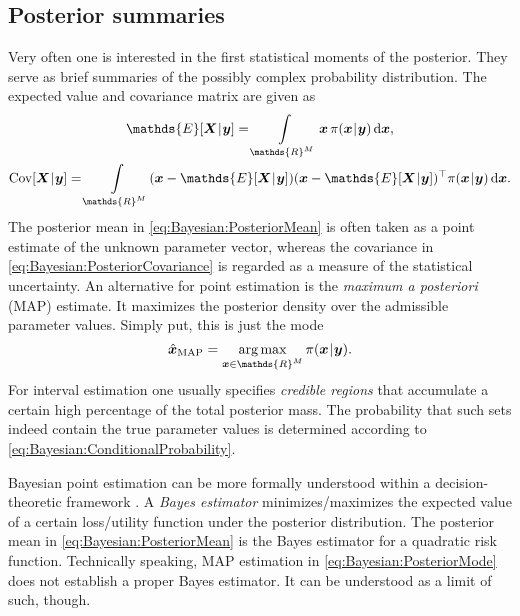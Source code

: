 \subsection{Posterior summaries}
Very often one is interested in the first statistical moments of the posterior.
They serve as brief summaries of the possibly complex probability distribution.
The expected value and covariance matrix are given as
\begin{gather}
  \mathds{E}[\bm{X} \cond \bm{y}] = \int\limits_{\mathds{R}^\dimParam} \bm{x} \, \pi(\bm{x} \cond \bm{y}) \, \mathrm{d} \bm{x}, \label{eq:Bayesian:PosteriorMean} \\
  \mathrm{Cov}[\bm{X} \cond \bm{y}]
  = \int\limits_{\mathds{R}^\dimParam} (\bm{x} - \mathds{E}[\bm{X} \cond \bm{y}]) (\bm{x} - \mathds{E}[\bm{X} \cond \bm{y}])^\top 
  \pi(\bm{x} \cond \bm{y}) \, \mathrm{d} \bm{x}. \label{eq:Bayesian:PosteriorCovariance}
\end{gather}
The posterior mean in \cref{eq:Bayesian:PosteriorMean} is often taken as a point estimate of the unknown parameter vector,
whereas the covariance in \cref{eq:Bayesian:PosteriorCovariance} is regarded as a measure of the statistical uncertainty.
An alternative for point estimation is the \emph{maximum a posteriori} (MAP) estimate.
It maximizes the posterior density over the admissible parameter values.
Simply put, this is just the mode
\begin{equation} \label{eq:Bayesian:PosteriorMode}
  \hat{\bm{x}}_{\mathrm{MAP}} = \operatorname*{arg\,max}_{\bm{x} \in \mathds{R}^\dimParam} \pi(\bm{x} \cond \bm{y}).
\end{equation}
For interval estimation one usually specifies \emph{credible regions} that accumulate a certain high percentage of the total posterior mass.
The probability that such sets indeed contain the true parameter values is determined according to \cref{eq:Bayesian:ConditionalProbability}.
\par %
Bayesian point estimation can be more formally understood within a decision-theoretic framework \cite{Bayesian:Berger1985,Bayesian:Robert2007}.
A \emph{Bayes estimator} minimizes/maximizes the expected value of a certain loss/utility function under the posterior distribution.
The posterior mean in \cref{eq:Bayesian:PosteriorMean} is the Bayes estimator for a quadratic risk function.
Technically speaking, MAP estimation in \cref{eq:Bayesian:PosteriorMode} does not establish a proper Bayes estimator.
It can be understood as a limit of such, though.
